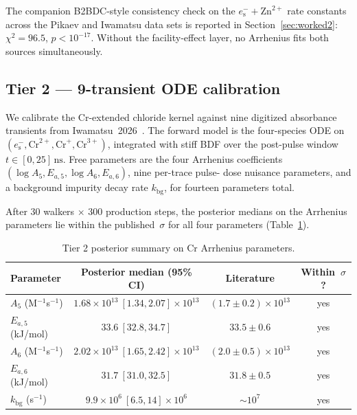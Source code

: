 \documentclass[12pt]{article}
\theoremstyle{plain}
\theoremstyle{definition}
\theoremstyle{remark}
\newcommand{\eS}{\ensuremath{e_{\mathrm{s}}^{-}}\xspace}
\begin{document}
The companion B2BDC-style consistency check on the
$\eS+\mathrm{Zn}^{2+}$ rate constants across the Pikaev and Iwamatsu data
sets is reported in Section~\ref{sec:worked2}:  $\chi^2 = 96.5$,
$p < 10^{-17}$.  Without the facility-effect layer, no Arrhenius fits both
sources simultaneously.

\subsection{Tier 2 --- 9-transient ODE calibration}\label{sec:val:tier2}

We calibrate the Cr-extended chloride kernel against nine digitized
absorbance transients from Iwamatsu~2026~\citep{Iwamatsu2026}.  The forward
model is the four-species ODE on $(\eS, \mathrm{Cr}^{2+}, \mathrm{Cr}^+,
\mathrm{Cr}^{3+})$, integrated with stiff BDF over the post-pulse window
$t\in[0, 25]\,\mathrm{ns}$.  Free parameters are the four Arrhenius
coefficients $(\log A_5, E_{a,5}, \log A_6, E_{a,6})$, nine per-trace pulse-
dose nuisance parameters, and a background impurity decay rate
$k_{\mathrm{bg}}$, for fourteen parameters total.

After $30$ walkers $\times$ $300$ production steps, the posterior medians
on the Arrhenius parameters lie within the published~$\sigma$ for all four
parameters (Table~\ref{tab:tier2_summary}).

\begin{table}[ht]\centering
\caption{Tier 2 posterior summary on Cr Arrhenius parameters.}
\label{tab:tier2_summary}
\small
\begin{tabular}{lccc}
\toprule
Parameter & Posterior median (95\% CI) & Literature & Within~$\sigma$? \\
\midrule
$A_5$ (M$^{-1}$s$^{-1}$) & $1.68\times 10^{13}\ [1.34, 2.07]\times 10^{13}$ & $(1.7\pm 0.2)\times 10^{13}$ & yes \\
$E_{a,5}$ (kJ/mol) & $33.6\ [32.8, 34.7]$ & $33.5\pm 0.6$ & yes \\
$A_6$ (M$^{-1}$s$^{-1}$) & $2.02\times 10^{13}\ [1.65, 2.42]\times 10^{13}$ & $(2.0\pm 0.5)\times 10^{13}$ & yes \\
$E_{a,6}$ (kJ/mol) & $31.7\ [31.0, 32.5]$ & $31.8\pm 0.5$ & yes \\
$k_{\mathrm{bg}}$ (s$^{-1}$) & $9.9\times 10^6\ [6.5, 14]\times 10^6$ & $\sim 10^7$ & yes \\
\bottomrule
\end{tabular}
\end{table}
\end{document}
